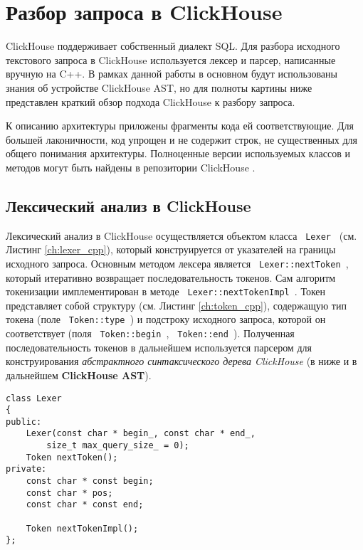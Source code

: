 \section{Разбор запроса в ClickHouse} \label{chap:clickhouse}
ClickHouse поддерживает собственный диалект SQL. Для разбора исходного текстового запроса в ClickHouse используется лексер и парсер, написанные вручную на C++. В рамках данной работы в основном будут использованы знания об устройстве ClickHouse AST, но для полноты картины ниже представлен краткий обзор подхода ClickHouse к разбору запроса. 

К описанию архитектуры приложены фрагменты кода ей соответствующие. Для большей лаконичности, код упрощен и не содержит строк, не существенных для общего понимания архитектуры. Полноценные версии используемых классов и методов могут быть найдены в репозитории ClickHouse \cite{ch_repo}.  

\subsection{Лексический анализ в ClickHouse}

Лексический анализ в ClickHouse осуществляется объектом класса \texttt{ Lexer } (см. Листинг \ref{ch:lexer_cpp}), который конструируется от указателей на границы исходного запроса. Основным методом лексера является \texttt{ Lexer::nextToken }, который итеративно возвращает последовательность токенов. Сам алгоритм токенизации имплементирован в методе \texttt{ Lexer::nextTokenImpl }. Токен представляет собой структуру (см. Листинг \ref{ch:token_cpp}), содержащую тип токена (поле \texttt{ Token::type }) и подстроку исходного запроса, которой он соответствует (поля \texttt{ Token::begin }, \texttt{ Token::end }). Полученная последовательность токенов в дальнейшем используется парсером для конструирования \textit{абстрактного синтаксического дерева ClickHouse} (в ниже и в дальнейшем \textbf{ClickHouse AST}).

\begin{code}
    \label{ch:lexer_cpp}
    \begin{verbatim}
class Lexer
{
public:
    Lexer(const char * begin_, const char * end_,
        size_t max_query_size_ = 0);
    Token nextToken();
private:
    const char * const begin;
    const char * pos;
    const char * const end;

    Token nextTokenImpl();
};
    \end{verbatim}
\end{code}

